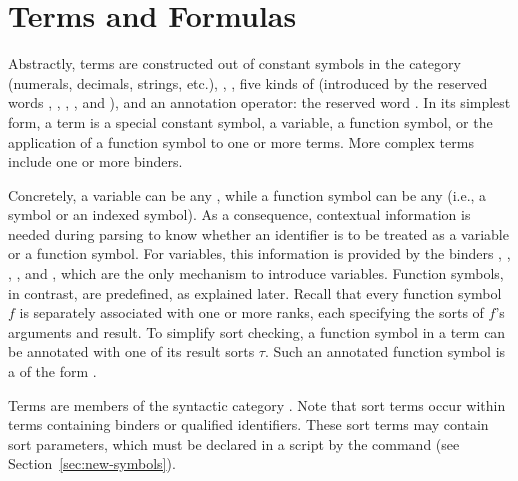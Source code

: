 \section{Terms and Formulas} \label{sec:concrete-terms}

Abstractly, terms are constructed out of 
constant symbols in the  category
(numerals, decimals, strings, etc.),
, 
, 
five kinds of  
(introduced by the reserved words , , , , and ),
and an annotation operator: the reserved word \ter{!}.
In its simplest form, a term is 
a special constant symbol,
a variable,
a function symbol,
or the application of a function symbol to one or more terms.
More complex terms include one or more binders.

Concretely, a variable can be any ,
while a function symbol can be any 
(i.e., a symbol or an indexed symbol).
As a consequence, contextual information is needed during parsing
to know whether an identifier is to be treated as a variable or 
a function symbol. 
For variables, this information is provided by the binders 
, , , , and , 
which are the only mechanism to introduce variables.
Function symbols, in contrast, are predefined, as explained later.
Recall that every function symbol $f$ is separately associated 
with one or more ranks,
each specifying the sorts of $f$'s arguments and result.
To simplify sort checking,
a function symbol in a term can be annotated with one of its result sorts $\tau$.
Such an annotated function symbol is a 
of the form .
\bigskip

\cTerms
\bigskip

Terms are members of the syntactic category .
Note that sort terms occur within terms containing binders or qualified identifiers.
These sort terms may contain sort parameters, 
which must be declared in a script by the command 
(see Section~\ref{sec:new-symbols}).
  


